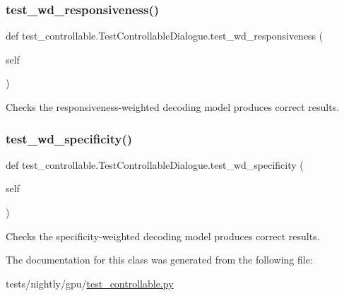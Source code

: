 \subsubsection{\texorpdfstring{test\+\_\+wd\+\_\+responsiveness()}{test\_wd\_responsiveness()}}
{\footnotesize\ttfamily def test\+\_\+controllable.\+Test\+Controllable\+Dialogue.\+test\+\_\+wd\+\_\+responsiveness (\begin{DoxyParamCaption}\item[{}]{self }\end{DoxyParamCaption})}

\begin{DoxyVerb}Checks the responsiveness-weighted decoding model produces correct results.
\end{DoxyVerb}
 \mbox{\label{classtest__controllable_1_1TestControllableDialogue_a357a886c76cc4d72cc2345eaee912f46}} 
\subsubsection{\texorpdfstring{test\+\_\+wd\+\_\+specificity()}{test\_wd\_specificity()}}
{\footnotesize\ttfamily def test\+\_\+controllable.\+Test\+Controllable\+Dialogue.\+test\+\_\+wd\+\_\+specificity (\begin{DoxyParamCaption}\item[{}]{self }\end{DoxyParamCaption})}

\begin{DoxyVerb}Checks the specificity-weighted decoding model produces correct results.
\end{DoxyVerb}
 

The documentation for this class was generated from the following file\+:\begin{DoxyCompactItemize}
\item 
tests/nightly/gpu/\hyperlink{test__controllable_8py}{test\+\_\+controllable.\+py}\end{DoxyCompactItemize}
